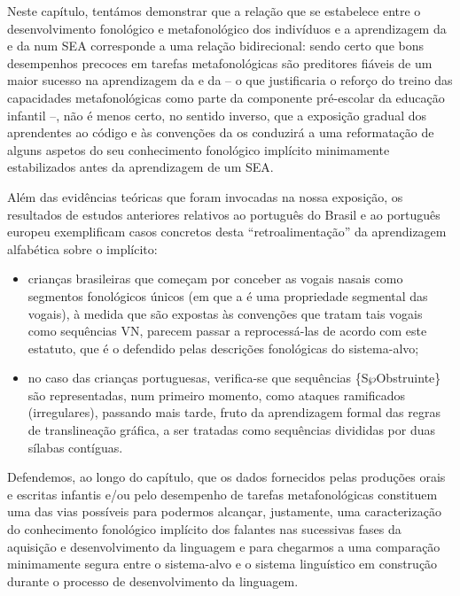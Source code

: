 \documentclass[output=paper]{LSP/langsci}
\begin{document}
Neste capítulo, tentámos demonstrar que a relação que se estabelece entre o desenvolvimento fonológico e metafonológico dos indivíduos e a aprendizagem da  e da  num SEA corresponde a uma relação bidirecional: sendo certo que bons desempenhos precoces em tarefas metafonológicas são preditores fiáveis de um maior sucesso na aprendizagem da  e da  -- o que justificaria o reforço do treino das capacidades metafonológicas como parte da componente pré-escolar da educação infantil --, não é menos certo, no sentido inverso, que a exposição gradual dos aprendentes ao código e às convenções da  os conduzirá a uma reformatação de alguns aspetos do seu conhecimento fonológico implícito minimamente estabilizados antes da aprendizagem de um SEA.

Além das evidências teóricas que foram invocadas na nossa exposição, os resultados de estudos anteriores relativos ao português do Brasil e ao português europeu exemplificam casos concretos desta ``retroalimentação'' da aprendizagem alfabética sobre o  implícito:

\begin{itemize}
\item  crianças brasileiras que começam por conceber as vogais nasais como segmentos fonológicos únicos (em que a  é uma propriedade segmental das vogais), à medida que são expostas às convenções que tratam tais vogais como sequências VN, parecem passar a reprocessá-las de acordo com este estatuto, que é o defendido pelas descrições fonológicas do sistema-alvo;
\item no caso das crianças portuguesas, verifica-se que sequências \{S$\wp$Obstruinte\} são representadas, num primeiro momento, como ataques ramificados (irregulares), passando mais tarde, fruto da aprendizagem formal das regras de translineação gráfica, a ser tratadas como sequências divididas por duas sílabas contíguas.
\end{itemize}

Defendemos, ao longo do capítulo, que os dados fornecidos pelas produções orais e escritas infantis e/ou pelo desempenho de tarefas metafonológicas constituem uma das vias possíveis para podermos alcançar, justamente, uma caracterização do conhecimento fonológico implícito dos falantes nas sucessivas fases da aquisição e desenvolvimento da linguagem e para chegarmos a uma comparação minimamente segura entre o sistema-alvo e o sistema linguístico em construção durante o processo de desenvolvimento da linguagem.
\end{document}
